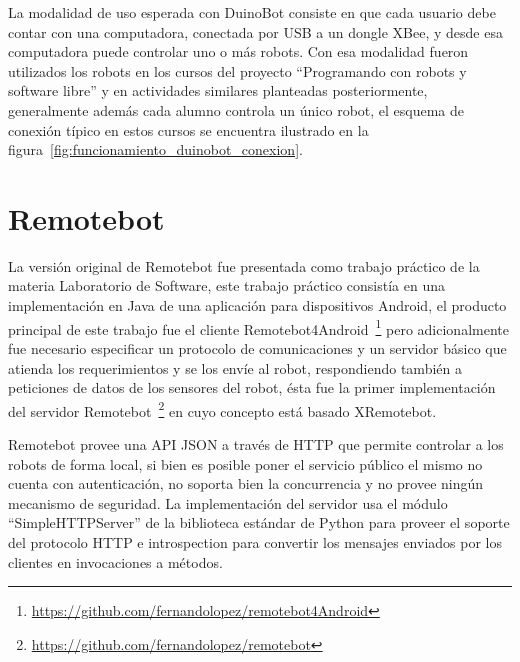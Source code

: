 La modalidad de uso esperada con DuinoBot consiste en que cada usuario
debe contar con una computadora, conectada por USB a un dongle XBee,
y desde esa computadora puede controlar uno o más robots. Con esa modalidad
fueron utilizados los robots en los cursos del proyecto
``Programando con robots y software libre'' y en actividades similares
planteadas posteriormente, generalmente además cada alumno controla
un único robot, el esquema de conexión típico en estos cursos se encuentra
ilustrado en la figura~\ref{fig:funcionamiento_duinobot_conexion}.

\section{Remotebot}\label{ch2:remotebot}

La versión original de Remotebot fue presentada como trabajo práctico
de la materia Laboratorio de Software, este trabajo práctico consistía
en una implementación en Java de una aplicación para dispositivos Android,
el producto principal de este trabajo fue el cliente
Remotebot4Android~\footnote{\url{https://github.com/fernandolopez/remotebot4Android}}
pero adicionalmente fue necesario especificar un protocolo de comunicaciones
y un servidor básico que atienda los requerimientos y se los envíe al
robot, respondiendo también a peticiones de datos de los sensores del
robot, ésta fue la primer implementación del servidor
Remotebot~\footnote{\url{https://github.com/fernandolopez/remotebot}}
en cuyo concepto está basado XRemotebot.

Remotebot provee una API JSON a través de HTTP que permite controlar a los
robots de forma local, si bien es posible poner el servicio público
el mismo no cuenta con autenticación, no soporta bien la concurrencia
y no provee ningún mecanismo de seguridad. La implementación del servidor
usa el módulo ``SimpleHTTPServer'' de la biblioteca estándar de Python para
proveer el soporte del protocolo HTTP e introspection para convertir los
mensajes enviados por los clientes en invocaciones a métodos.

